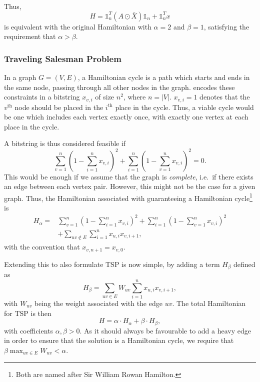 Thus,
\begin{equation}
    H = \mathds{1}_n^T \left( A \odot \bar{X} \right) \mathds{1}_n + \mathds{1}_n^T x
\end{equation}
is equivalent with the original Hamiltonian with $\alpha = 2$ and $\beta = 1$, satisfying the requirement that $\alpha > \beta$.


\subsubsection{Traveling Salesman Problem}
In a graph $G = (V, E)$, a Hamiltonian cycle is a path which starts and ends in the same node, passing through all other nodes in the graph.
\textcite{IsingFormulations} encodes these constraints in a bitstring $x_{v, i}$ of size $n^2$, where $n = |V|$.
$x_{v, i} = 1$ denotes that the $v^{\text{th}}$ node should be placed in the $i^{\text{th}}$ place in the cycle.
Thus, a viable cycle would be one which includes each vertex exactly once, with exactly one vertex at each place in the cycle.

A bitstring is thus considered feasible if
\begin{equation}
    \sum_{v = 1}^n \left( 1 - \sum_{i = 1}^n x_{v,i} \right)^2 + \sum_{i = 1}^n \left( 1 - \sum_{v = 1}^n x_{v,i} \right)^2 = 0.
\end{equation}
This would be enough if we assume that the graph is \textit{complete}, i.e.\ if there exists an edge between each vertex pair.
However, this might not be the case for a given graph.
Thus, the Hamiltonian associated with guaranteeing a Hamiltonian cycle\footnote{Both are named after Sir William Rowan Hamilton.} is
\begin{equation}\label{eq:H_A}
\begin{split}
    H_{\alpha} =& \sum_{v = 1}^n \left( 1 - \sum_{i = 1}^n x_{v,i} \right)^2 + \sum_{i = 1}^n \left( 1 - \sum_{v = 1}^n x_{v,i} \right)^2 \\
    &+ \sum_{uv \notin E}\sum_{i = 1}^n x_{u,i}x_{v,i+1},
\end{split}
\end{equation}
with the convention that $x_{v,n+1} = x_{v,0}$.

Extending this to also formulate TSP is now simple, by adding a term $H_{\beta}$ defined as
\begin{equation}
    H_{\beta} = \sum_{uv \in E} W_{uv} \sum_{i = 1}^n x_{u,i}x_{v,i+1},
\end{equation}
with $W_{uv}$ being the weight associated with the edge $uv$.
The total Hamiltonian for TSP is then
\begin{equation}\label{eq:Hamilton_TSP}
    H = \alpha \cdot H_{\alpha} + \beta \cdot H_{\beta},
\end{equation}
with coefficients $\alpha,\beta > 0$.
As it should always be favourable to add a heavy edge in order to ensure that the solution is a Hamiltonian cycle, we require that $\beta \max_{uv \in E} W_{uv} < \alpha$.


